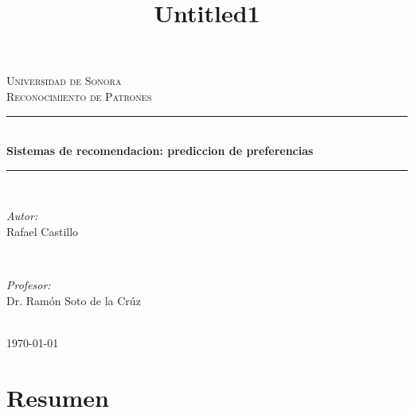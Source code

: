 \documentclass[11pt]{article}
\title{Untitled1}
\begin{document}

\begin{titlepage}

\newcommand{\HRule}{\rule{\linewidth}{0.5mm}} %

\center %

\textsc{\LARGE Universidad de Sonora}\\[1.5cm] %
\textsc{\Large Reconocimiento de Patrones}\\[0.5cm] %

\HRule \\[0.4cm]
{ \huge \bfseries Sistemas de recomendacion: prediccion de preferencias}\\[0.4cm] %
\HRule \\[1.5cm]

\begin{minipage}{0.4\textwidth}
\begin{flushleft} \large
\emph{Autor:}\\
Rafael Castillo %
\end{flushleft}
\end{minipage}
~
\begin{minipage}{0.4\textwidth}
\begin{flushright} \large
\emph{Profesor:} \\
Dr. Ramón Soto de la Crúz %
\end{flushright}
\end{minipage}\\[4cm]

{\large \today}\\[3cm]

\vfill

\end{titlepage}
\tableofcontents

\newpage


\section{Resumen} 
\end{document}
